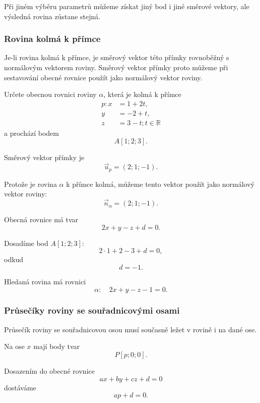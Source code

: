 Při jiném výběru parametrů můžeme získat jiný bod i jiné směrové
vektory, ale výsledná rovina zůstane stejná.


\subsubsection{Rovina kolmá k přímce}
\label{subsubsec:Plane_perpendicular_to_line}

Je-li rovina kolmá k přímce, je směrový vektor této přímky rovnoběžný
s normálovým vektorem roviny. Směrový vektor přímky proto můžeme při
sestavování obecné rovnice použít jako normálový vektor roviny.

\begin{example}
    \label{exa:Plane_perpendicular_to_line}

    Určete obecnou rovnici roviny $\alpha$, která je kolmá k přímce
    \[
        \begin{aligned}
            p: x&=1+2t,\\
            y&=-2+t,\\
            z&=3-t; t\in\mathbb{R}
        \end{aligned}
    \]
    a prochází bodem
    \[
        A[1;2;3].
    \]

    Směrový vektor přímky je
    \[
        \vec{u}_p=(2;1;-1).
    \]

    Protože je rovina $\alpha$ k přímce kolmá, můžeme tento vektor
    použít jako normálový vektor roviny:
    \[
        \vec{n}_{\alpha}=(2;1;-1).
    \]

    Obecná rovnice má tvar
    \[
        2x+y-z+d=0.
    \]

    Dosadíme bod $A[1;2;3]$:
    \[
        2\cdot1+2-3+d=0,
    \]
    odkud
    \[
        d=-1.
    \]

    Hledaná rovina má rovnici
    \[
        \alpha:\quad 2x+y-z-1=0.
    \]
\end{example}


\subsubsection{Průsečíky roviny se souřadnicovými osami}
\label{subsubsec:Plane_axis_intercepts}

Průsečík roviny se souřadnicovou osou musí současně ležet v rovině
i na dané ose.

Na ose $x$ mají body tvar
\[
    P[p;0;0].
\]

Dosazením do obecné rovnice
\[
    ax+by+cz+d=0
\]
dostáváme
\[
    ap+d=0.
\]

